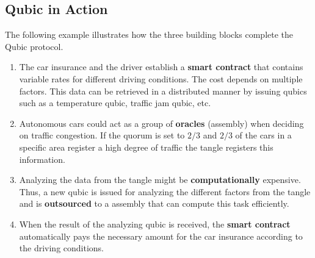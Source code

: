 \subsection{Qubic in Action}
The following example illustrates how the three building blocks complete the Qubic protocol.

\begin{enumerate}
    \item The car insurance and the driver establish a \textbf{smart contract} that contains variable rates for different driving conditions. The cost depends on multiple factors. This data can be retrieved in a distributed manner by issuing qubics such as a temperature qubic, traffic jam qubic, etc.
    \item Autonomous cars could act as a group of \textbf{oracles} (assembly) when deciding on traffic congestion. If the quorum is set to $2/3$ and $2/3$ of the cars in a specific area register a high degree of traffic the tangle registers this information.
    \item Analyzing the data from the tangle might be \textbf{computationally} expensive. Thus, a new qubic is issued for analyzing the different factors from the tangle and is \textbf{outsourced} to a assembly that can compute this task efficiently.
    \item When the result of the analyzing qubic is received, the \textbf{smart contract} automatically pays the necessary amount for the car insurance according to the driving conditions.
\end{enumerate}
